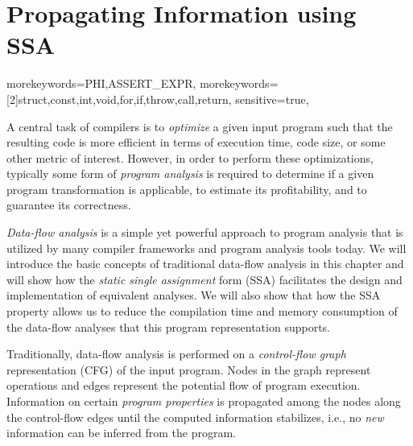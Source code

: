 \providecommand\lcode{\begingroup \small\urlstyle{tt}\Url}
\providecommand\lident{\begingroup \small\urlstyle{tt}\Url}

\chapter{Propagating Information using SSA}
\label{chapter:constant_propagation_is_easier}
\newcommand{\obacht}[2]{\marginpar{\tiny\textbf{#1:} #2}}

{
  morekeywords={PHI,ASSERT_EXPR},
  morekeywords=[2]{struct,const,int,void,for,if,throw,call,return},
  sensitive=true,
}

\lstset{
  mathescape=true,
  language=DNlisting,
  basicstyle=\small,
  keywordstyle=\ttfamily,
  keywordstyle=[2]\bfseries,
  numbers=left
}


A central task of compilers is to \emph{optimize} a given input program such that the resulting code is more efficient in terms of execution time, code size, or some other metric of interest. 
However, in order to perform these optimizations, typically some form of \emph{program analysis} is required to determine if a given program transformation is applicable, to estimate its profitability, and to guarantee its correctness.

\emph{Data-flow analysis} is a simple yet powerful
approach to program analysis that is utilized by many compiler frameworks and program analysis tools today. 
We will introduce the basic concepts of traditional data-flow analysis in this chapter and will show how the \emph{static single assignment} form (SSA) facilitates the design and implementation of equivalent analyses. 
We will also show that how the SSA property allows us to reduce the compilation time and memory consumption of the data-flow analyses that this program representation supports.

Traditionally, data-flow analysis is performed on a \emph{control-flow graph} representation (CFG) of the input program. 
Nodes in the graph represent operations and edges represent the potential flow of program execution. 
Information on certain \emph{program properties} is propagated among the nodes along the control-flow edges until the computed information stabilizes, i.e., no \emph{new} information can be inferred from the program.

